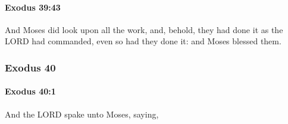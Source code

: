 		\paragraph{Exodus 39:43} %
			\label{EXODUS-39-43}

			And Moses did look upon all the work, and, behold, they had done it as the LORD had commanded, even so had they done it: and Moses blessed them.

	\subsubsection{Exodus 40} %
		\label{EXODUS-40}

		\paragraph{Exodus 40:1} %
			\label{EXODUS-40-1}

			And the LORD spake unto Moses, saying,

